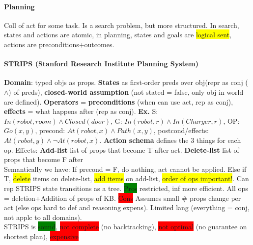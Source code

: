 \paragraph{Planning} Coll of act for some task. Is a search problem,
but more structured. In search, states and actions are atomic, in
planning, states and goals are \colorbox{yellow}{logical sent},
actions are preconditions+outcomes.
\paragraph{STRIPS (Stanford Research Institute Planning System)}
\textbf{Domain}: typed objs as props. \textbf{States} as first-order
preds over obj(repr as conj ($\land$) of preds), \textbf{closed-world assumption} (not stated = false,
only obj in world are defined). \textbf{Operators} =
\textbf{preconditions} (when can use act, rep as conj), \textbf{effects} = what
happens after (rep as conj). \textbf{Ex.} S: $In(robot,room)\land
Closed(door)$, G: $In(robot,r) \land In(Charger, r)$, OP: $Go(x,y)$,
precond: $At(robot, x)\land Path(x,y)$, postcond/effects: $At(robot,y)\land
\neg At(robot,x)$. \textbf{Action schema} defines the 3 things for
each op. Effects: \textbf{Add-list} list of props that become T after
act. \textbf{Delete-list} list of props that become F after
\\ Semantically we have: If precond = F, do nothing, act cannot be
applied. Else if T, \colorbox{yellow}{delete} items on delete-list,
\colorbox{yellow}{add items} on add-list, \colorbox{yellow}{order of
  ops important!}. Can rep STRIPS state transitions as a
tree. \colorbox{green}{Pros} restricted, inf more efficient. All ops =
deletion+Addition of props of KB. \colorbox{red}{Cons} Assumes small
\# props change per act (else ops hard to def and reasoning
expens). Limited lang (everything = conj, not applc to all domains).
\\ STRIPS is \colorbox{green}{sound}, \colorbox{red}{not complete} (no
backtracking), \colorbox{red}{not optimal} (no guarantee on shortest
plan), \colorbox{red}{expensive}
